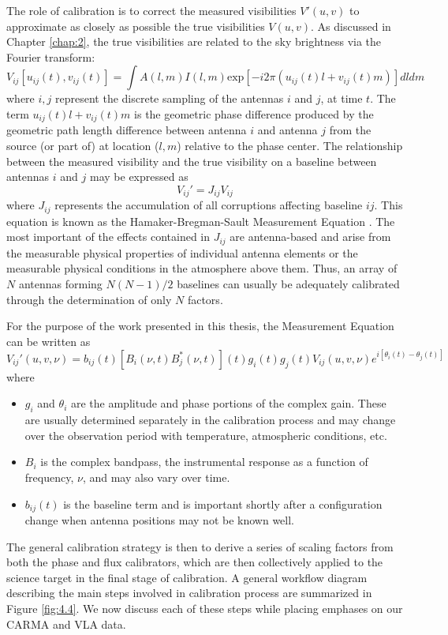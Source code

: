 The role of calibration is to correct the measured visibilities $V'(u,v)$ to approximate as closely as possible the true visibilities $V(u,v)$. As discussed in Chapter \ref{chap:2}, the true visibilities are related to the sky brightness via the Fourier transform:
\begin{equation}
V_{ij}[u_{ij}(t),v_{ij}(t)] = \int A(l,m) I(l,m) \mathrm{exp}[-i2\pi(u_{ij}(t)l + v_{ij}(t)m)]	dl	dm
\end{equation}
where $i,j$ represent the discrete sampling of the antennas $i$ and $j$, at time $t$. The term $u_{ij}(t)l + v_{ij}(t)m$ is the geometric phase difference produced by the geometric path length difference between antenna $i$ and antenna $j$ from the source (or part of) at location ($l,m$) relative to the phase center. The relationship between the measured visibility and the true visibility on a baseline between antennas $i$ and $j$ may be expressed as
\begin{equation}
V_{ij}' =  J_{ij}V_{ij}
\end{equation}
where $ J_{ij}$ represents the accumulation of all corruptions affecting baseline $ij$. This equation is known as the Hamaker-Bregman-Sault Measurement Equation \citep{hamaker_1996}. The most important of the effects contained in $J_{ij}$ are antenna-based and arise from the measurable physical properties of individual antenna elements or the measurable physical conditions in the atmosphere above them. Thus, an array of $N$ antennas forming $N(N-1)/2$ baselines can usually be adequately calibrated through the determination of only $N$ factors.

For the purpose of the work presented in this thesis, the Measurement Equation can be written as
\begin{equation}
V_{ij}'(u,v,\nu) = b_{ij}(t)[B_{i}(\nu ,t)B_{j}^{*}(\nu ,t)](t)g_{i}(t)g_{j}(t)V_{ij}(u,v,\nu)e^{i[\theta _{i}(t) - \theta _{j}(t)]}
\end{equation}
where
\begin{itemize}
\item $g_{i}$ and $\theta _{i}$ are the amplitude and phase portions of the complex gain. These are usually determined separately in the calibration process and may change over the observation period with temperature, atmospheric conditions, etc. 
\item $B_{i}$ is the complex bandpass, the instrumental response as a function of frequency, $\nu$, and may also vary over time.
\item $b_{ij}(t)$ is the baseline term and is important shortly after a configuration change when antenna positions may not be known well.
\end{itemize}
The general calibration strategy is then to derive a series of scaling factors from both the phase and flux calibrators, which are then collectively applied to the science target in the final stage of calibration. A general workflow diagram describing the main steps involved in calibration process are summarized in Figure \ref{fig:4.4}. We now discuss each of these steps while placing emphases on our CARMA and VLA data.

